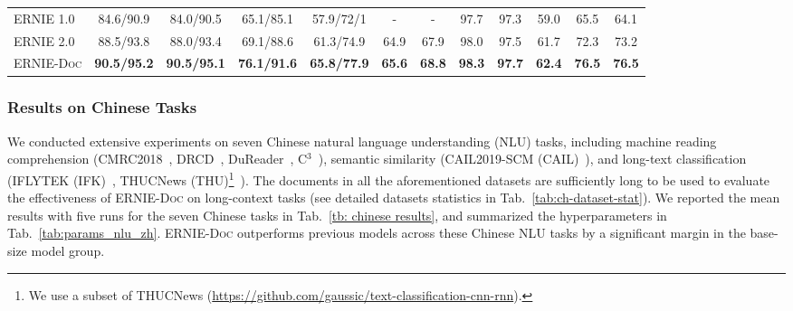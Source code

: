 \documentclass[11pt,a4paper]{article}
\newcommand{\mname}{\textsc{ERNIE-Doc}\xspace}
\begin{document}
\begin{table*}[]
{\begin{tabular}{l|ccccccccccc}
ERNIE 1.0 \citep{sun2019ernie}      & 84.6/90.9                     & 84.0/90.5          & 65.1/85.1          & 57.9/72/1          & -             & -                        & 97.7          & 97.3                     & 59.0             & 65.5           & 64.1           \\
ERNIE 2.0 \citep{sun2020ernie}      & 88.5/93.8                     & 88.0/93.4          & 69.1/88.6          & 61.3/74.9          & 64.9          & 67.9                     & 98.0          & 97.5                     & 61.7             & 72.3           & 73.2           \\ \hline
\mname      & \textbf{90.5/95.2}            & \textbf{90.5/95.1} & \textbf{76.1/91.6} & \textbf{65.8/77.9} & \textbf{65.6} & \textbf{68.8}            & \textbf{98.3} & \textbf{97.7}            & \textbf{62.4}    & \textbf{76.5}  & \textbf{76.5}  \\ \hline
\end{tabular}
}
\caption{Results on seven Chinese NLU tasks for \mname-base model.The results of the models with "$\ast$" are from \citet{cui2019pre}. The XLNet-zh is the abbreviation of Chinese-XLNet. Notably, the result of BERT on CAIL was obtained from \citet{cail}, where BERT was post-pretrained with a legal dataset.}
\label{tb: chinese results}
\end{table*}

\subsubsection{Results on Chinese Tasks}
We conducted extensive experiments on seven Chinese natural language understanding (NLU) tasks, including machine reading comprehension (CMRC2018~\citep{cmrc2018}, DRCD~\citep{drcd}, DuReader~\citep{dureader}, C$^3$~\citep{c3}), semantic similarity (CAIL2019-SCM (CAIL)~\citep{cail}), and long-text classification (IFLYTEK (IFK)~\citep{iflytek}, THUCNews (THU)\footnote{We use a subset of THUCNews (\url{https://github.com/gaussic/text-classification-cnn-rnn}).}~\citep{thucnews}). The documents in all the aforementioned datasets are sufficiently long to be used to evaluate the effectiveness of \mname on long-context tasks (see detailed datasets statistics in Tab.~\ref{tab:ch-dataset-stat}). We reported the mean results with five runs for the seven Chinese tasks in Tab.~\ref{tb: chinese results}, and summarized the hyperparameters in Tab.~\ref{tab:params_nlu_zh}. \mname outperforms previous models across these Chinese NLU tasks by a significant margin in the base-size model group.  
\end{document}
